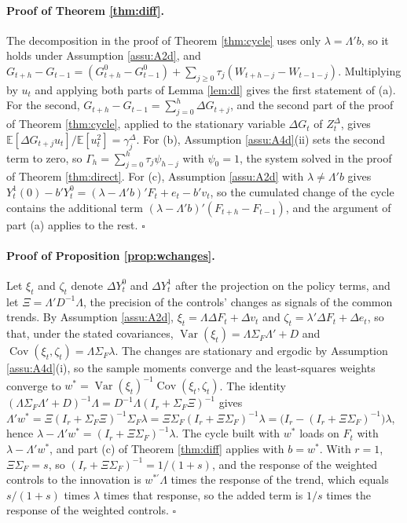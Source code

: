 \documentclass[12pt,a4paper]{article}
\theoremstyle{definition}
\theoremstyle{definition}\newtheorem{example}{Example}
\theoremstyle{definition}\newtheorem{definition}{Definition}
\newcommand{\E}{\mathbb{E}}
\begin{document}
\paragraph{Proof of Theorem \ref{thm:diff}.} The decomposition in the proof of Theorem \ref{thm:cycle} uses only $\lambda=\Lambda'b$, so it holds under Assumption \ref{assu:A2d}, and $G_{t+h}-G_{t-1}=(G^0_{t+h}-G^0_{t-1})+\sum_{j\geq0}\tau_j(W_{t+h-j}-W_{t-1-j})$. Multiplying by $u_t$ and applying both parts of Lemma \ref{lem:dl} gives the first statement of (a). For the second, $G_{t+h}-G_{t-1}=\sum_{j=0}^h\Delta G_{t+j}$, and the second part of the proof of Theorem \ref{thm:cycle}, applied to the stationary variable $\Delta G_t$ of $Z^\Delta_t$, gives $\E[\Delta G_{t+j}u_t]/\E[u_t^2]=\gamma^\Delta_j$. For (b), Assumption \ref{assu:A4d}(ii) sets the second term to zero, so $\Gamma_h=\sum_{j=0}^h\tau_j\psi_{h-j}$ with $\psi_0=1$, the system solved in the proof of Theorem \ref{thm:direct}. For (c), Assumption \ref{assu:A2d} with $\lambda\neq\Lambda'b$ gives $Y^1_t(0)-b'Y^0_t=(\lambda-\Lambda'b)'F_t+e_t-b'v_t$, so the cumulated change of the cycle contains the additional term $(\lambda-\Lambda'b)'(F_{t+h}-F_{t-1})$, and the argument of part (a) applies to the rest. $\square$

\paragraph{Proof of Proposition \ref{prop:wchanges}.} Let $\xi_t$ and $\zeta_t$ denote $\Delta Y^0_t$ and $\Delta Y^1_t$ after the projection on the policy terms, and let $\Xi=\Lambda'D^{-1}\Lambda$, the precision of the controls' changes as signals of the common trends. By Assumption \ref{assu:A2d}, $\xi_t=\Lambda\Delta F_t+\Delta v_t$ and $\zeta_t=\lambda'\Delta F_t+\Delta e_t$, so that, under the stated covariances, $\operatorname{Var}(\xi_t)=\Lambda\Sigma_F\Lambda'+D$ and $\operatorname{Cov}(\xi_t,\zeta_t)=\Lambda\Sigma_F\lambda$. The changes are stationary and ergodic by Assumption \ref{assu:A4d}(i), so the sample moments converge and the least-squares weights converge to $w^\ast=\operatorname{Var}(\xi_t)^{-1}\operatorname{Cov}(\xi_t,\zeta_t)$. The identity $(\Lambda\Sigma_F\Lambda'+D)^{-1}\Lambda=D^{-1}\Lambda(I_r+\Sigma_F\Xi)^{-1}$ gives $\Lambda'w^\ast=\Xi(I_r+\Sigma_F\Xi)^{-1}\Sigma_F\lambda=\Xi\Sigma_F(I_r+\Xi\Sigma_F)^{-1}\lambda=\big(I_r-(I_r+\Xi\Sigma_F)^{-1}\big)\lambda$, hence $\lambda-\Lambda'w^\ast=(I_r+\Xi\Sigma_F)^{-1}\lambda$. The cycle built with $w^\ast$ loads on $F_t$ with $\lambda-\Lambda'w^\ast$, and part (c) of Theorem \ref{thm:diff} applies with $b=w^\ast$. With $r=1$, $\Xi\Sigma_F=s$, so $(I_r+\Xi\Sigma_F)^{-1}=1/(1+s)$, and the response of the weighted controls to the innovation is $w^{\ast\prime}\Lambda$ times the response of the trend, which equals $s/(1+s)$ times $\lambda$ times that response, so the added term is $1/s$ times the response of the weighted controls. $\square$
\end{document}
